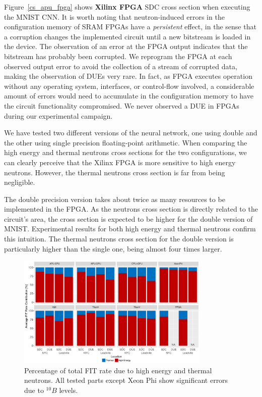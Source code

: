 Figure~\ref{cs_apu_fpga} shows \textbf{Xilinx FPGA} SDC cross section when executing the MNIST CNN. It is worth noting that neutron-induced errors in the configuration memory of SRAM FPGAs have a \textit{persistent} effect, in the sense that a corruption changes the implemented circuit until a new bitstream is loaded in the device. The observation of an error at the FPGA output indicates that the bitstream has probably been corrupted. 
We reprogram the FPGA at each observed output error to avoid the collection of a stream of corrupted data, making the observation of DUEs very rare. In fact, as FPGA executes operation without any operating system, interfaces, or control-flow involved, a considerable amount of errors would need to accumulate in the configuration memory to have the circuit functionality compromised. We never observed a DUE in FPGAs during our experimental campaign.

We have tested two different versions of the neural network, one using double and the other using single precision floating-point arithmetic. When comparing the high energy and thermal neutrons cross sections for the two configurations, we can clearly perceive that the Xilinx FPGA is more sensitive to high energy neutrons. However, the thermal neutrons cross section is far from being negligible.

The double precision version takes about twice as many resources to be implemented in the FPGA. As the neutrons cross section is directly related to the circuit's area, the cross section is expected to be higher for the double version of MNIST. Experimental results for both high energy and thermal neutrons confirm this intuition. The thermal neutrons cross section for the double version is particularly higher than the single one, being almost four times larger.

\begin{figure}[!tb]
    \centering
    \includegraphics[width=0.82\textwidth]{figs/FIT-rates-all-devices.pdf}
    \caption{Percentage of total FIT rate due to high energy and thermal neutrons. All tested parts except Xeon Phi show significant errors due to $^{10}B$ levels.}
    \label{fig_fitpercents}
\end{figure}

